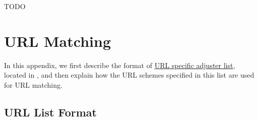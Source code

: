 \documentclass[
a4paper,
12pt,
]
{article}
\begin{document}
 TODO
 
 \section{URL Matching}\label{app_matching}
 
 In this appendix, we first describe the format of \href{https://github.com/Langenscheiss/bibitnow/blob/master/nameResources/urlSpecificAdjusterList.json}{URL specific adjuster list}, located in
 , 
 and then explain how the URL schemes specified in this list are used for URL matching.
 
 \subsection{URL List Format}\label{app_matching_list}
 
\end{document}
